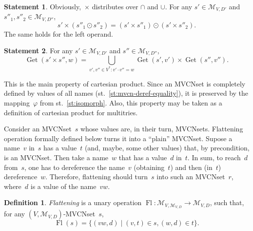 \documentclass{article}
\theoremstyle{definition}
\newtheorem{Df}{Definition}
\newtheorem{St}{Statement}
\newcommand{\setcharmvcn}{M}
\newcommand{\setsymbol}[3]{\mathcal{#1}_{#2,#3}}
\newcommand{\setmvcn}[2]{\setsymbol{\setcharmvcn}{#1}{#2}}
\newcommand{\flatten}{\operatorname{Fl}}
\newcommand{\deref}{\operatorname{Get}}
\begin{document}
\begin{St}\label{st:cartesian-distributivity}
Obviously,~$\times$ distributes over $\cap$ and $\cup$.
For any $s' \in \setmvcn{V}{D'}$ and $s''_1, s''_2 \in \setmvcn{V}{D''}$,
\[
  s'\times(s''_1\odot s''_2) = (s'\times s''_1) \odot (s'\times s''_2) .
\]
The same holds for the left operand.
\end{St}

\begin{St}\label{st:deref-cartesian}
For any $s' \in \setmvcn{V}{D'}$ and $s'' \in \setmvcn{V}{D''}$,
\[
  \deref(s' \times s'', w) =
      \bigcup_{v',v''\in V^\ast: v'\cdot v'' = w}
          \deref(s', v')
          \times
          \deref(s'', v'') .
\]
\end{St}

This is the main property of cartesian product. Since an MVCNset is
completely defined by values of all names (st.~\ref{st:mvcn-deref-equality}),
it is preserved by the mapping~$\varphi$ from st.~\ref{st:isomorph}. Also, this
property may be taken as a definition of cartesian product for multitries.

Consider an MVCNset~$s$ whose values are, in their turn, MVCNsets.  Flattening
operation formally defined below turns it into a ``plain'' MVCNset.  Supose a
name~$v$ in~$s$ has a value~$t$ (and, maybe, some other values) that, by
precondition, is an MVCNset.  Then take a name~$w$ that has a value~$d$ in~$t$.
In sum, to reach~$d$ from~$s$, one has to dereference the name~$v$
(obtaining~$t$) and then (in~$t$) dereference~$w$. Therefore, flattening should
turn~$s$ into such an MVCNset~$r$, where~$d$ is a value of the name~$vw$.

\begin{Df}\label{df:flatten}
\emph{Flattening} is a unary operation
$\flatten : \setmvcn{V}{\setmvcn{V}{D}} \to\setmvcn{V}{D}$,
such that, for any $(V,\setmvcn{V}{D})$-MVCNset~$s$,
\[
  \flatten(s) = \{ (vw, d) \mid (v, t) \in s, (w, d) \in t \} .
\]
\end{Df}
\end{document}
